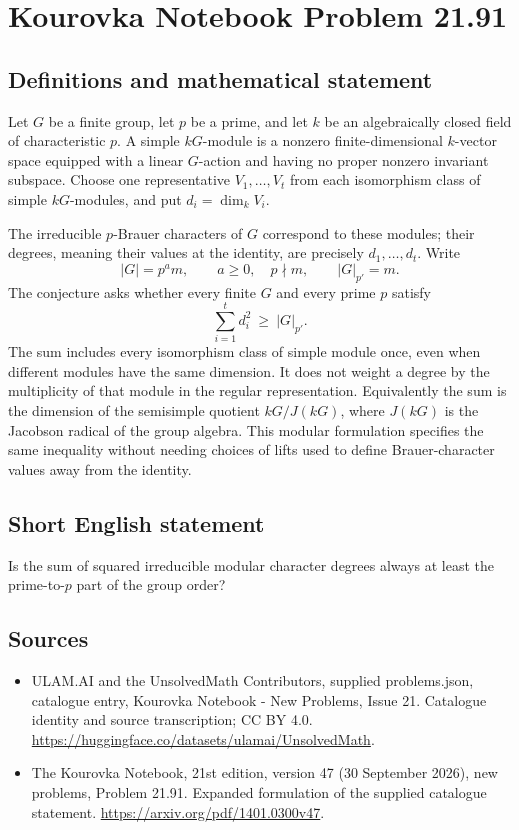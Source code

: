 \documentclass[11pt,a4paper]{article}
\begin{document}
\section*{Kourovka Notebook Problem 21.91}\label{statement}

\subsection{Definitions and mathematical statement}
Let $G$ be a finite group, let $p$ be a prime, and let $k$ be an algebraically closed field of characteristic $p$. A simple $kG$-module is a nonzero finite-dimensional $k$-vector space equipped with a linear $G$-action and having no proper nonzero invariant subspace. Choose one representative $V_1,\ldots,V_t$ from each isomorphism class of simple $kG$-modules, and put $d_i=\dim_kV_i$.

The irreducible $p$-Brauer characters of $G$ correspond to these modules; their degrees, meaning their values at the identity, are precisely $d_1,\ldots,d_t$. Write
\[
 |G|=p^a m,\qquad a\ge0,\quad p\nmid m,
 \qquad |G|_{p'}=m.
\]
The conjecture asks whether every finite $G$ and every prime $p$ satisfy
\[
 \sum_{i=1}^{t}d_i^2\ \ge\ |G|_{p'}.
\]
The sum includes every isomorphism class of simple module once, even when different modules have the same dimension. It does not weight a degree by the multiplicity of that module in the regular representation. Equivalently the sum is the dimension of the semisimple quotient $kG/J(kG)$, where $J(kG)$ is the Jacobson radical of the group algebra. This modular formulation specifies the same inequality without needing choices of lifts used to define Brauer-character values away from the identity.
\subsection{Short English statement}
Is the sum of squared irreducible modular character degrees always at least the prime-to-$p$ part of the group order?
\subsection{Sources}
\begin{itemize}
\item[S1] ULAM.AI and the UnsolvedMath Contributors, supplied problems.json, catalogue entry, Kourovka Notebook - New Problems, Issue 21. Catalogue identity and source transcription; CC BY 4.0.
\url{https://huggingface.co/datasets/ulamai/UnsolvedMath}.
\item[S2] The Kourovka Notebook, 21st edition, version 47 (30 September 2026), new problems, Problem 21.91. Expanded formulation of the supplied catalogue statement.
\url{https://arxiv.org/pdf/1401.0300v47}.
\end{itemize}
\end{document}
